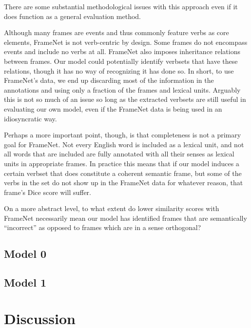 \documentclass{article} %
\begin{document}
There are some substantial methodological issues with this approach even if it does function as a general evaluation method. 

Although many frames are events and thus commonly feature verbs as core elements, FrameNet is not verb-centric by design. Some frames do not encompass events and include no verbs at all.
FrameNet also imposes inheritance relations between frames. Our model could potentially identify verbsets that have these relations, though it has no way of recognizing it has done so.
In short, to use FrameNet's data, we end up discarding most of the information in the annotations and using only a fraction of the frames and lexical units. Arguably this is not so much of an issue so long as the extracted verbsets are still useful in evaluating our own model, even if the FrameNet data is being used in an idiosyncratic way.

Perhaps a more important point, though, is that completeness is not a primary goal for FrameNet. Not every English word is included as a lexical unit, and not all words that are included are fully annotated with all their senses as lexical units in appropriate frames.
In practice this means that if our model induces a certain verbset that does constitute a coherent semantic frame, but some of the verbs in the set do not show up in the FrameNet data for whatever reason, that frame's Dice score will suffer.
% 




On a more abstract level, to what extent do lower similarity scores with FrameNet necessarily mean our model has identified frames that are semantically ``incorrect'' as opposed to frames which are in a sense orthogonal?







\subsection{Model 0}

\subsection{Model 1}


\section{Discussion}
\end{document}
